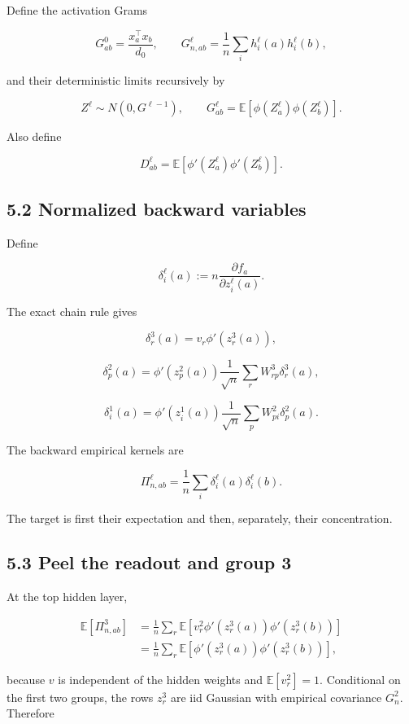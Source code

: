 Define the activation Grams

\[
G^0_{ab}=\frac{x_a^\top x_b}{d_0},
\qquad
G^\ell_{n,ab}
=
\frac1n\sum_i h_i^\ell(a)h_i^\ell(b),
\]


and their deterministic limits recursively by

\[
Z^\ell\sim N(0,G^{\ell-1}),
\qquad
G^\ell_{ab}
=
\mathbb E[\phi(Z^\ell_a)\phi(Z^\ell_b)].
\]


Also define

\[
D^\ell_{ab}
=
\mathbb E[
\phi'(Z^\ell_a)\phi'(Z^\ell_b)].
\]


\subsection*{5.2 Normalized backward variables}


Define

\[
\delta_i^\ell(a)
:=
n\frac{\partial f_a}{\partial z_i^\ell(a)}.
\]


The exact chain rule gives

\[
\delta_r^3(a)
=
v_r\phi'(z_r^3(a)),
\]


\[
\delta_p^2(a)
=
\phi'(z_p^2(a))
\frac1{\sqrt n}\sum_rW^3_{rp}\delta_r^3(a),
\]


\[
\delta_i^1(a)
=
\phi'(z_i^1(a))
\frac1{\sqrt n}\sum_pW^2_{pi}\delta_p^2(a).
\]


The backward empirical kernels are

\[
\Pi^\ell_{n,ab}
=
\frac1n\sum_i
\delta_i^\ell(a)\delta_i^\ell(b).
\]


The target is first their expectation and then, separately, their
concentration.

\subsection*{5.3 Peel the readout and group 3}


At the top hidden layer,

\[
\begin{aligned}
\mathbb E[\Pi^3_{n,ab}]
&=
\frac1n\sum_r
\mathbb E[
v_r^2\phi'(z_r^3(a))\phi'(z_r^3(b))]
\\
&=
\frac1n\sum_r
\mathbb E[
\phi'(z_r^3(a))\phi'(z_r^3(b))],
\end{aligned}
\]


because \(v\) is independent of the hidden weights and
\(\mathbb E[v_r^2]=1\). Conditional on the first two groups, the rows
\(z_r^3\) are iid Gaussian with empirical covariance \(G^2_n\). Therefore

